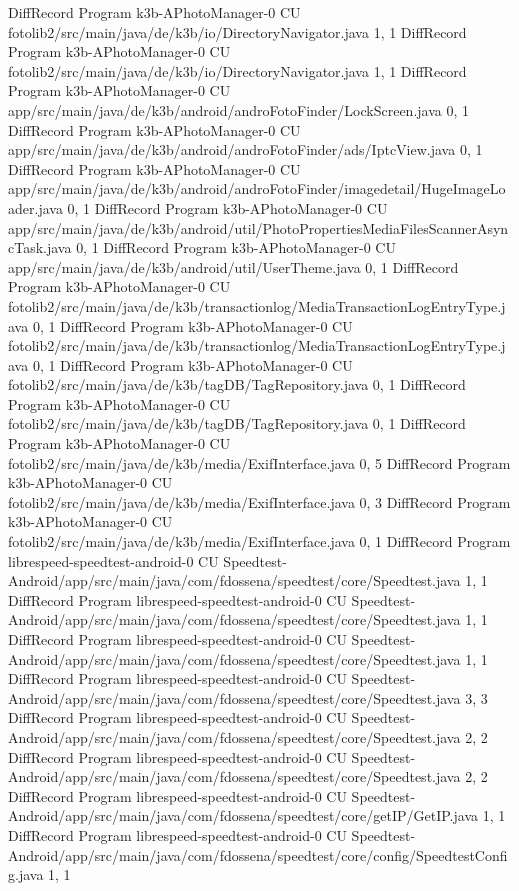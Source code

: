 DiffRecord Program k3b-APhotoManager-0 CU fotolib2/src/main/java/de/k3b/io/DirectoryNavigator.java  {1, 1}
DiffRecord Program k3b-APhotoManager-0 CU fotolib2/src/main/java/de/k3b/io/DirectoryNavigator.java  {1, 1}
DiffRecord Program k3b-APhotoManager-0 CU app/src/main/java/de/k3b/android/androFotoFinder/LockScreen.java  {0, 1}
DiffRecord Program k3b-APhotoManager-0 CU app/src/main/java/de/k3b/android/androFotoFinder/ads/IptcView.java  {0, 1}
DiffRecord Program k3b-APhotoManager-0 CU app/src/main/java/de/k3b/android/androFotoFinder/imagedetail/HugeImageLoader.java  {0, 1}
DiffRecord Program k3b-APhotoManager-0 CU app/src/main/java/de/k3b/android/util/PhotoPropertiesMediaFilesScannerAsyncTask.java  {0, 1}
DiffRecord Program k3b-APhotoManager-0 CU app/src/main/java/de/k3b/android/util/UserTheme.java  {0, 1}
DiffRecord Program k3b-APhotoManager-0 CU fotolib2/src/main/java/de/k3b/transactionlog/MediaTransactionLogEntryType.java  {0, 1}
DiffRecord Program k3b-APhotoManager-0 CU fotolib2/src/main/java/de/k3b/transactionlog/MediaTransactionLogEntryType.java  {0, 1}
DiffRecord Program k3b-APhotoManager-0 CU fotolib2/src/main/java/de/k3b/tagDB/TagRepository.java  {0, 1}
DiffRecord Program k3b-APhotoManager-0 CU fotolib2/src/main/java/de/k3b/tagDB/TagRepository.java  {0, 1}
DiffRecord Program k3b-APhotoManager-0 CU fotolib2/src/main/java/de/k3b/media/ExifInterface.java  {0, 5}
DiffRecord Program k3b-APhotoManager-0 CU fotolib2/src/main/java/de/k3b/media/ExifInterface.java  {0, 3}
DiffRecord Program k3b-APhotoManager-0 CU fotolib2/src/main/java/de/k3b/media/ExifInterface.java  {0, 1}
DiffRecord Program librespeed-speedtest-android-0 CU Speedtest-Android/app/src/main/java/com/fdossena/speedtest/core/Speedtest.java  {1, 1}
DiffRecord Program librespeed-speedtest-android-0 CU Speedtest-Android/app/src/main/java/com/fdossena/speedtest/core/Speedtest.java  {1, 1}
DiffRecord Program librespeed-speedtest-android-0 CU Speedtest-Android/app/src/main/java/com/fdossena/speedtest/core/Speedtest.java  {1, 1}
DiffRecord Program librespeed-speedtest-android-0 CU Speedtest-Android/app/src/main/java/com/fdossena/speedtest/core/Speedtest.java  {3, 3}
DiffRecord Program librespeed-speedtest-android-0 CU Speedtest-Android/app/src/main/java/com/fdossena/speedtest/core/Speedtest.java  {2, 2}
DiffRecord Program librespeed-speedtest-android-0 CU Speedtest-Android/app/src/main/java/com/fdossena/speedtest/core/Speedtest.java  {2, 2}
DiffRecord Program librespeed-speedtest-android-0 CU Speedtest-Android/app/src/main/java/com/fdossena/speedtest/core/getIP/GetIP.java  {1, 1}
DiffRecord Program librespeed-speedtest-android-0 CU Speedtest-Android/app/src/main/java/com/fdossena/speedtest/core/config/SpeedtestConfig.java  {1, 1}

